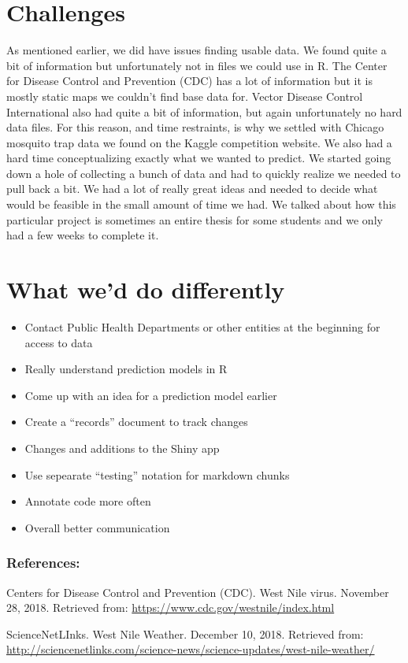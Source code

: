 \documentclass[]{article}
\providecommand{\tightlist}{%
  \setlength{\itemsep}{0pt}\setlength{\parskip}{0pt}}
\begin{document}
\hypertarget{challenges}{%
\section{Challenges}\label{challenges}}

As mentioned earlier, we did have issues finding usable data. We found
quite a bit of information but unfortunately not in files we could use
in R. The Center for Disease Control and Prevention (CDC) has a lot of
information but it is mostly static maps we couldn't find base data for.
Vector Disease Control International also had quite a bit of
information, but again unfortunately no hard data files. For this
reason, and time restraints, is why we settled with Chicago mosquito
trap data we found on the Kaggle competition website. We also had a hard
time conceptualizing exactly what we wanted to predict. We started going
down a hole of collecting a bunch of data and had to quickly realize we
needed to pull back a bit. We had a lot of really great ideas and needed
to decide what would be feasible in the small amount of time we had. We
talked about how this particular project is sometimes an entire thesis
for some students and we only had a few weeks to complete it.

\hypertarget{what-wed-do-differently}{%
\section{What we'd do differently}\label{what-wed-do-differently}}

\begin{itemize}
\tightlist
\item
  Contact Public Health Departments or other entities at the beginning
  for access to data
\item
  Really understand prediction models in R
\item
  Come up with an idea for a prediction model earlier
\item
  Create a ``records'' document to track changes
\item
  Changes and additions to the Shiny app
\item
  Use sepearate ``testing'' notation for markdown chunks
\item
  Annotate code more often
\item
  Overall better communication
\end{itemize}

\hypertarget{references}{%
\subsubsection{References:}\label{references}}

Centers for Disease Control and Prevention (CDC). West Nile virus.
November 28, 2018. Retrieved from:
\url{https://www.cdc.gov/westnile/index.html}

ScienceNetLInks. West Nile Weather. December 10, 2018. Retrieved from:
\url{http://sciencenetlinks.com/science-news/science-updates/west-nile-weather/}
\end{document}
